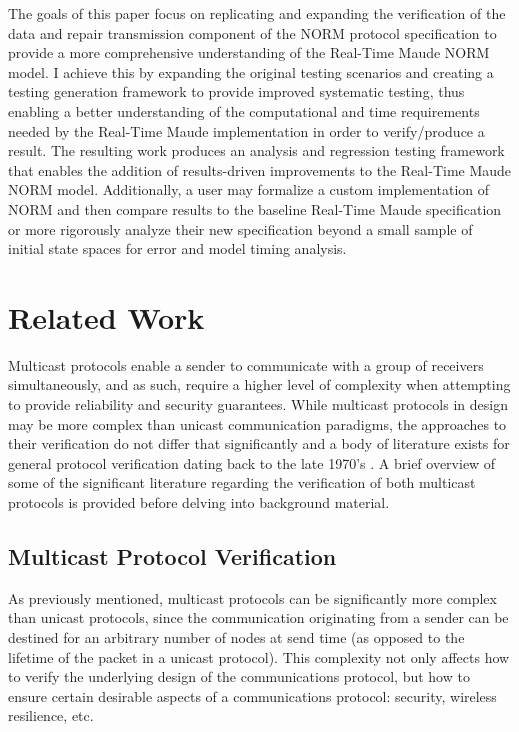 \documentclass[10pt, journal]{IEEEtran}
\begin{document}
The goals of this paper focus on replicating and expanding the verification of the data and repair transmission component of the NORM protocol specification to provide a more comprehensive understanding of the Real-Time Maude NORM model. I achieve this by expanding the original testing scenarios and creating a testing generation framework to provide improved systematic testing, thus enabling a better understanding of the computational and time requirements needed by the Real-Time Maude implementation in order to verify/produce a result. The resulting work produces an analysis and regression testing framework that enables the addition of results-driven improvements to the Real-Time Maude NORM model. Additionally, a user may formalize a custom implementation of NORM and then compare results to the baseline Real-Time Maude specification or more rigorously analyze their new specification beyond a small sample of initial state spaces for error and model timing analysis. 

\section{Related Work}
Multicast protocols enable a sender to communicate with a group of receivers simultaneously, and as such, require a higher level of complexity when attempting to provide reliability and security guarantees. While multicast protocols in design may be more complex than unicast communication paradigms, the approaches to their verification do not differ that significantly and a body of literature exists for general protocol verification dating back to the late 1970's \cite{Bochman1980}. A brief overview of some of the significant literature regarding the verification of both multicast protocols is provided before delving into background material.

\subsection{Multicast Protocol Verification}
As previously mentioned, multicast protocols can be significantly more complex than unicast protocols, since the communication originating from a sender can be destined for an arbitrary number of nodes at send time (as opposed to the lifetime of the packet in a unicast protocol). This complexity not only affects how to verify the underlying design of the communications protocol, but how to ensure certain desirable aspects of a communications protocol: security, wireless resilience, etc.
\end{document}

